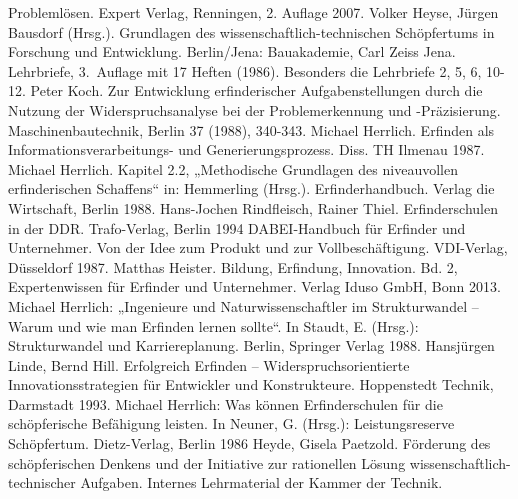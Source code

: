 \documentclass[11pt,a4paper]{article}
\begin{document}
\begin{thebibliography}{xxx}
  Problemlösen. Expert Verlag, Renningen, 2. Auflage 2007.
 Volker Heyse, Jürgen Bausdorf (Hrsg.). Grundlagen des
  wissenschaftlich-technischen Schöpfertums in Forschung und Entwicklung.
  Berlin/Jena: Bauakademie, Carl Zeiss Jena. Lehrbriefe, 3.~Auflage mit 17
  Heften (1986).  Besonders die Lehrbriefe 2, 5, 6, 10-12.
 Peter Koch. Zur Entwicklung erfinderischer Aufgabenstellungen
  durch die Nutzung der Widerspruchsanalyse bei der Problemerkennung und
  -Präzisierung. Maschinenbautechnik, Berlin 37 (1988), 340-343.
 Michael Herrlich. Erfinden als Informationsverarbeitungs- und
  Generierungsprozess. Diss. TH Ilmenau 1987.
 Michael Herrlich. Kapitel 2.2, „Methodische Grundlagen des
  niveauvollen erfinderischen Schaffens“ in: Hemmerling (Hrsg.).
  Erfinderhandbuch. Verlag die Wirtschaft, Berlin 1988.
 Hans-Jochen Rindfleisch, Rainer Thiel. Erfinderschulen in der
  DDR.  Trafo-Verlag, Berlin 1994
 DABEI-Handbuch für Erfinder und Unternehmer. Von der Idee zum
  Produkt und zur Vollbeschäftigung. VDI-Verlag, Düsseldorf 1987.
 Matthas Heister. Bildung, Erfindung, Innovation. Bd. 2,
  Expertenwissen für Erfinder und Unternehmer. Verlag Iduso GmbH, Bonn 2013.
 Michael Herrlich: „Ingenieure und Naturwissenschaftler im
  Strukturwandel – Warum und wie man Erfinden lernen sollte“. In Staudt,
  E. (Hrsg.): Strukturwandel und Karriereplanung. Berlin, Springer Verlag
  1988.
 Hansjürgen Linde, Bernd Hill. Erfolgreich Erfinden –
  Widerspruchsorientierte Innovationsstrategien für Entwickler und
  Konstrukteure. Hoppenstedt Technik, Darmstadt 1993.
 Michael Herrlich: Was können Erfinderschulen für die
  schöpferische Befähigung leisten. In Neuner, G. (Hrsg.): Leistungsreserve
  Schöpfertum.  Dietz-Verlag, Berlin 1986
 Heyde, Gisela Paetzold. Förderung des schöpferischen Denkens und
  der Initiative zur rationellen Lösung wissenschaftlich-technischer Aufgaben.
  Internes Lehrmaterial der Kammer der Technik.
\end{thebibliography}
\end{document}
